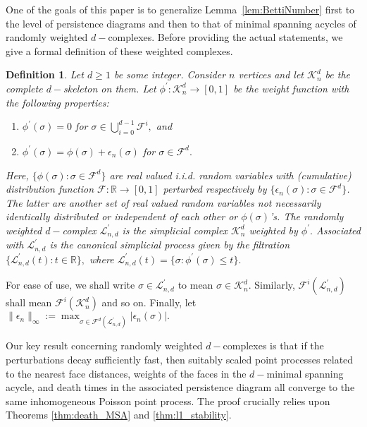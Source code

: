 \documentclass[12pt]{amsart}
\newcommand{\dy}[1]{\textcolor{magenta}{#1}}
\newcommand{\gt}[1]{\textcolor{blue}{#1}}
\renewcommand{\dy}[1]{#1}
\renewcommand{\gt}[1]{#1}
\newtheorem{definition}[theorem]{Definition}
\numberwithin{equation}{section}
\numberwithin{theorem}{section}
\newcommand{\Real}{\mathbb R}
\newcommand{\1}{\mathbf{1}}
\def\F{\mathcal{F}}
\def\sF{\mathscr{F}}
\def\Lp{\mathcal{L}^\prime}
\def\K{\mathcal{K}}
\def\phip{\phi^\prime}
\begin{document}
One of the goals of this paper is to generalize Lemma~\ref{lem:BettiNumber} first to the level of persistence diagrams and then to that of minimal spanning acycles of randomly weighted $d-$complexes. Before providing the actual statements, we give a formal definition of these weighted complexes.
%
\begin{definition}
\label{defn:Generically_Perturbed_Weighted}
Let $d \geq 1$ be some integer. Consider $n$ vertices and let $\K_{n}^{d}$ be the complete $d-$skeleton on them. Let $\phip : \K_{n}^{d} \to [0,1]$ be the weight function with the following properties:
\begin{enumerate}
\item $\phip(\sigma) = 0$ for $\sigma \in \bigcup_{i = 0}^{d - 1} \F^i,$ and
%
\item $\phip(\sigma) = \phi(\sigma) + \epsilon_n(\sigma)$ for $\sigma \in \F^{d}.$  
%
\end{enumerate}
%
Here, $\{\phi(\sigma) : \sigma \in \F^{d}\}$ are real valued i.i.d. random variables with \gt{(cumulative) distribution function $\sF : \Real \to [0, 1]$} perturbed respectively by $\{\epsilon_n(\sigma) :  \sigma \in \F^{d}\}$. The latter are  another set of real valued random variables not necessarily identically distributed or independent of each other or $\phi(\sigma)$'s.
The {\em randomly weighted $d-$complex} $\Lp_{n, d}$ is the simplicial complex $\K_n^d$ weighted by $\phip.$ Associated with $\Lp_{n, d}$ is the canonical simplicial process given by the filtration $\{\Lp_{n, d}(t): t \in \Real\},$ where $\Lp_{n, d}(t) = \{\sigma: \phip (\sigma) \leq t\}.$
\end{definition}
%
%
For ease of use, we shall write $\sigma \in \Lp_{n, d}$ to mean $\sigma \in \K_{n}^{d}.$  Similarly, $\F^i(\Lp_{n, d})$ shall mean $\F^i(\K_{n}^{d})$ and so on. Finally, let $\|\epsilon_n\|_{\infty} := \max_{\sigma \in \F^{d}(\Lp_{n, d})} |\epsilon_n(\sigma)|.$

Our key result concerning randomly weighted $d-$complexes is that if the perturbations decay sufficiently fast, then suitably scaled point processes related to the nearest face distances, weights of the faces in the $d-$minimal spanning acycle, and death times in the associated persistence diagram all converge to \dy{the same} inhomogeneous Poisson point process. The proof crucially relies upon Theorems \ref{thm:death_MSA} and \ref{thm:l1_stability}.
\end{document}
